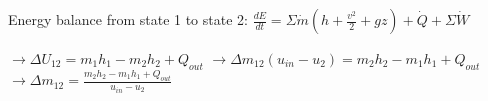 Energy balance from state 1 to state 2:  
\( \frac{dE}{dt} = \Sigma \dot{m} (h + \frac{v^2}{2} + gz) + \dot{Q} + \Sigma \dot{W} \)  

\( \rightarrow \Delta U_{12} = m_1 h_1 - m_2 h_2 + Q_{out} \)  
\( \rightarrow \Delta m_{12} (u_{in} - u_2) = m_2 h_2 - m_1 h_1 + Q_{out} \)  
\( \rightarrow \Delta m_{12} = \frac{m_2 h_2 - m_1 h_1 + Q_{out}}{u_{in} - u_2} \)